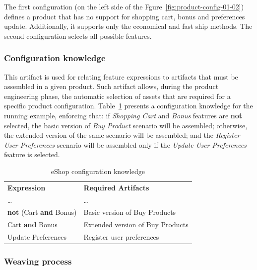 \documentclass{acm_proc_article-sp}
\begin{document}
The first configuration (on the left side of the Fgure~\ref{fig:product-config-01-02}) defines a product that has no support for shopping cart, bonus and preferences update. Additionally, it supports only the economical and fast ship methods. The second configuration selects all possible features. 

\subsubsection{Configuration knowledge}

This artifact is used for relating feature expressions to artifacts that must be assembled in a given product. Such artifact allows, during the product engineering phase, the automatic selection of assets that are required for a specific product configuration. Table~\ref{tab:eshop-running-example} presents a configuration knowledge 
for the running example, enforcing that: if \emph{Shopping Cart} and \emph{Bonus} features are {\bf not} selected, the 
basic version of \emph{Buy Product} scenario will be assembled; otherwise, the extended version of the same 
scenario will be assembled; and the \emph{Register User Preferences} scenario will be assembled only if the \emph{Update 
User Preferences} feature is selected.

\begin{table}[h]
\begin{center}
\caption{eShop configuration knowledge} \label{tab:eshop-running-example}
\begin{tabular}{ll}
   \hline\noalign{\smallskip}
  {\bf Expression} & {\bf Required Artifacts} \\
   \noalign{\smallskip}
   \hline
   \noalign{\smallskip}
    \ldots & \ldots \\
    {\bf not} (Cart {\bf and} Bonus)\hspace{2pt} & Basic version of Buy Products \\
    Cart {\bf and} Bonus & Extended version of Buy Products \\
    Update Preferences & Register user preferences	 \\       
  \hline
\end{tabular}
\end{center}
\end{table}


\subsubsection{Weaving process}
\end{document}

